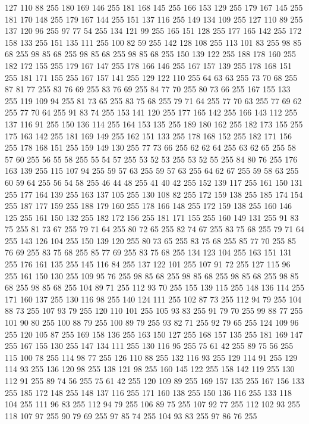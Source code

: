 127 110 88 255 180 169 146 255 181 168 145 255 166 153 129 255 179 167 145 255 181 170 148 255 179 167 144 255 151 137 116 255 149 134 109 255 127 110 89 255 137 120 96 255 97 77 54 255 134 121 99 255 165 151 128 255 177 165 142 255 172 158 133 255 151 135 111 255 100 82 59 255 142 128 108 255 113 101 83 255 98 85 68 255 98 85 68 255 98 85 68 255 98 85 68 255 150 139 122 255 188 178 160 255 182 172 155 255 179 167 147 255 178 166 146 255 167 157 139 255 178 168 151 255 181 171 155 255 167 157 141 255 129 122 110 255 64 63 63 255 73 70 68 255 87 81 77 255 83 76 69 255 83 76 69 255 84 77 70 255 80 73 66 255 167 155 133 255 119 109 94 255 81 73 65 255 83 75 68 255 79 71 64 255 77 70 63 255 77 69 62 255 77 70 64 255 91 83 74 255 153 141 120 255 177 165 142 255 166 143 112 255 137 116 91 255 150 136 114 255 164 153 135 255 189 180 162 255 182 173 155 255 175 163 142 255 181 169 149 255 162 151 133 255 178 168 152 255 182 171 156 255 178 168 151 255
159 149 130 255 77 73 66 255 62 62 64 255 63 62 65 255 58 57 60 255 56 55 58 255 55 54 57 255 53 52 53 255 53 52 55 255 84 80 76 255 176 163 139 255 115 107 94 255 59 57 63 255 59 57 63 255 64 62 67 255 59 58 63 255 60 59 64 255 56 54 58 255 46 44 48 255 41 40 42 255 152 139 117 255 161 150 131 255 177 164 139 255 163 137 105 255 130 108 82 255 172 159 138 255 185 174 154 255 187 177 159 255 188 179 160 255 178 166 148 255 172 159 138 255 160 146 125 255 161 150 132 255 182 172 156 255 181 171 155 255 160 149 131 255 91 83 75 255 81 73 67 255 79 71 64 255 80 72 65 255 82 74 67 255 83 75 68 255 79 71 64 255 143 126 104 255 150 139 120 255 80 73 65 255 83 75 68 255 85 77 70 255 85 76 69 255 83 75 68 255 85 77 69 255 83 75 68 255 134 123 104 255 163 151 131 255 176 161 135 255 145 116 84 255 137 122 101 255 107 91 72 255 127 115 96 255 161 150 130 255 109 95 76 255 98 85 68 255 98 85 68 255 98 85 68 255
98 85 68 255 98 85 68 255 104 89 71 255 112 93 70 255 155 139 115 255 148 136 114 255 171 160 137 255 130 116 98 255 140 124 111 255 102 87 73 255 112 94 79 255 104 88 73 255 107 93 79 255 120 110 101 255 105 93 83 255 91 79 70 255 99 88 77 255 101 90 80 255 100 88 79 255 100 89 79 255 93 82 71 255 92 79 65 255 124 109 96 255 120 105 87 255 169 158 136 255 163 150 127 255 168 157 135 255 181 169 147 255 167 155 130 255 147 134 111 255 130 116 95 255 75 61 42 255 89 75 56 255 115 100 78 255 114 98 77 255 126 110 88 255 132 116 93 255 129 114 91 255 129 114 93 255 136 120 98 255 138 121 98 255 160 145 122 255 158 142 119 255 130 112 91 255 89 74 56 255 75 61 42 255 120 109 89 255 169 157 135 255 167 156 133 255 185 172 148 255 148 137 116 255 171 160 138 255 150 136 116 255 133 118 104 255 111 96 83 255 112 94 79 255 106 89 75 255 107 92 77 255 112 102 93 255 118 107 97 255 90 79 69 255 97 85 74 255 104 93 83 255 97 86 76 255
